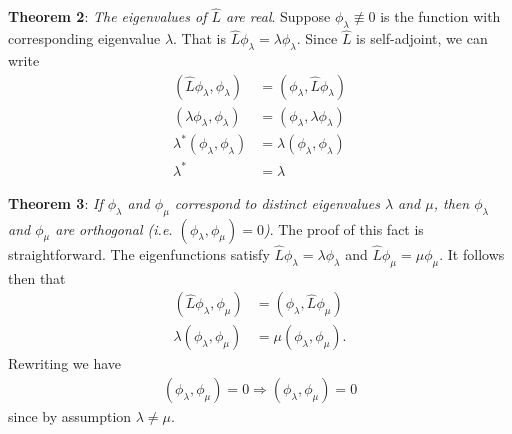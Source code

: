 \textbf{Theorem 2}: \textit{The eigenvalues of $\hat{L}$ are real}.
Suppose $\phi_{\lambda} \not\equiv 0$ is the function with corresponding eigenvalue $\lambda$.
That is $\hat{L} \phi_{\lambda} = \lambda \phi_{\lambda}$.
Since $\hat{L}$ is self-adjoint, we can write
\begin{align}
    (\hat{L}\phi_{\lambda},\phi_{\lambda}) &= (\phi_{\lambda},\hat{L}\phi_{\lambda}) \nonumber \\
    (\lambda \phi_{\lambda},\phi_{\lambda}) &= (\phi_{\lambda},\lambda \phi_{\lambda}) \nonumber \\
    \lambda^{*} (\phi_{\lambda},\phi_{\lambda}) &= \lambda (\phi_{\lambda},\phi_{\lambda}) \nonumber \\
    \lambda^{*} &= \lambda
\end{align}

\textbf{Theorem 3}: \textit{If $\phi_{\lambda}$ and $\phi_{\mu}$ correspond to distinct eigenvalues $\lambda$ and $\mu$, then $\phi_{\lambda}$ and $\phi_{\mu}$ are orthogonal (i.e. $(\phi_{\lambda},\phi_{\mu}) = 0$)}.
The proof of this fact is straightforward.
The eigenfunctions satisfy $\hat{L} \phi_{\lambda} = \lambda \phi_{\lambda}$ and $\hat{L} \phi_{\mu} = \mu \phi_{\mu}$.
It follows then that
\begin{align}
    (\hat{L}\phi_{\lambda},\phi_{\mu}) &= (\phi_{\lambda},\hat{L}\phi_{\mu}) \nonumber \\
    \lambda(\phi_{\lambda},\phi_{\mu}) &= \mu(\phi_{\lambda},\phi_{\mu})
.\end{align}
Rewriting we have
\begin{eqnarray}
    [\lambda - \mu](\phi_{\lambda},\phi_{\mu}) = 0 \Rightarrow (\phi_{\lambda},\phi_{\mu}) = 0
\end{eqnarray}
since by assumption $\lambda \ne \mu$.

